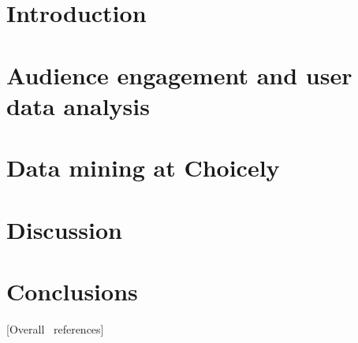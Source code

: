 \documentclass[english]{tktltiki}
\begin{document}
\mytableofcontents

	\section{Introduction}
	\label{section::introduction}
	
	
	\section{Audience engagement and user data analysis}
	\label{section::audience-engagement-and-user-data-analysis}
		

	
	\section{Data mining at Choicely}
	\label{section::data-mining-at-choicely}
	
	
	\section{Discussion}
	\label{section::discussion}
	

	\section{Conclusions}
	\label{section::conclusions}
	    

\pagebreak

[Overall \ references]

\nocite{*}



\lastpage
\appendices
\pagestyle{empty}

%
%
\end{document}
